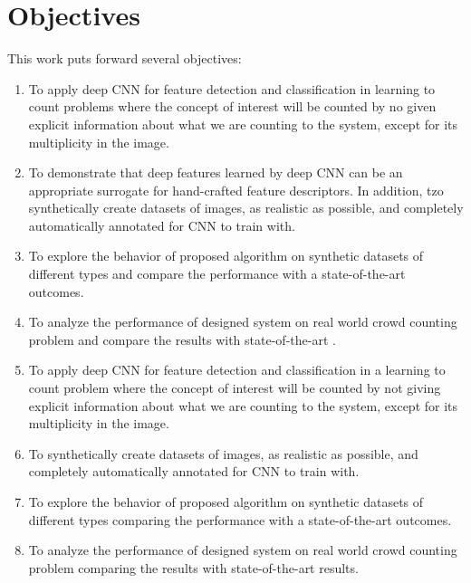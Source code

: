 \section{Objectives}
This work puts forward several objectives:
\begin{enumerate}

\item To apply deep CNN for feature detection and classification in learning to count problems where the concept of interest will be counted by no given explicit information about what we are counting to the system, except for its multiplicity in the image.
\item To demonstrate that deep features learned by deep CNN can be an appropriate surrogate for hand-crafted feature descriptors. In addition, tzo  synthetically create datasets of images, as realistic as possible, and completely automatically annotated for CNN to train with.
\item To explore the behavior of proposed algorithm on synthetic datasets of different types and compare the performance with a state-of-the-art outcomes\cite{segui2015learning}.   
\item To analyze the performance of designed system on real world crowd counting problem and compare the results with state-of-the-art \cite{chan2008privacy}.   

\item To apply deep CNN for feature detection and classification in a learning to count problem where the concept of interest will be counted by not giving explicit information about what we are counting to the system, except for its multiplicity in the image. 
\item To synthetically create datasets of images, as realistic as possible, and completely automatically annotated for CNN to train with.
\item To explore the behavior of proposed algorithm on synthetic datasets of different types comparing the performance with a state-of-the-art outcomes\cite{segui2015learning}.   
\item To analyze the performance of designed system on real world crowd counting problem comparing the results with state-of-the-art results\cite{chan2008privacy}.   


\end{enumerate}
